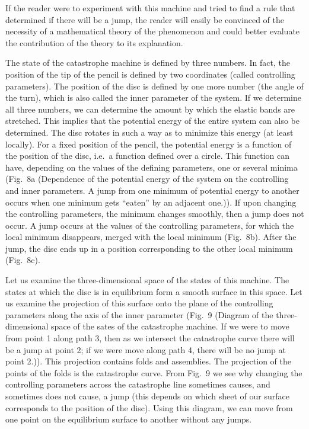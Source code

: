 \documentclass[12pt]{amsart}
\begin{document}
If the reader were to experiment with this machine and tried to find a rule that
determined if there will be a jump, the reader will easily be convinced of the
necessity of a mathematical theory of the phenomenon and could better evaluate
the contribution of the theory to its explanation.

The state of the catastrophe machine is defined by three numbers.
In fact, the position of the tip of the pencil is defined by two coordinates
(called controlling parameters).
The position of the disc is defined by one more number (the angle of the turn),
which is also called the inner parameter of the system.
If we determine all three numbers, we can determine the amount by which the
elastic bands are stretched.
This implies that the potential energy of the entire system can also be
determined.
The disc rotates in such a way as to minimize this energy (at least locally).
For a fixed position of the pencil, the potential energy is a function of the
position of the disc, i.e.~a function defined over a circle.
This function can have, depending on the values of the defining parameters,
one or several minima (Fig.~8a (Dependence of the potential energy of the system
on the controlling and inner parameters.
A jump from one minimum of potential energy to another occurs when one minimum
gets ``eaten'' by an adjacent one.)).
If upon changing the controlling parameters, the minimum changes smoothly, then
a jump does not occur.
A jump occurs at the values of the controlling parameters, for which the local
minimum disappears, merged with the local minimum (Fig.~8b).
After the jump, the disc ends up in a position corresponding to the other local
minimum (Fig.~8c).

Let us examine the three-dimensional space of the states of this machine.
The states at which the disc is in equilibrium form a smooth surface in this
space.
Let us examine the projection of this surface onto the plane of the controlling
parameters along the axis of the inner parameter (Fig.~9 (Diagram of the
three-dimensional space of the sates of the catastrophe machine.
If we were to move from point 1 along path 3, then as we intersect the
catastrophe curve there will be a jump at point 2; if we were move along path 4,
there will be no jump at point 2.)).
This projection contains folds and assemblies.
The projection of the points of the folds is the catastrophe curve.
From Fig.~9 we see why changing the controlling parameters across the
catastrophe line sometimes causes, and sometimes does not cause, a jump (this
depends on which sheet of our surface corresponds to the position of the disc).
Using this diagram, we can move from one point on the equilibrium surface to
another without any jumps.
\end{document}
